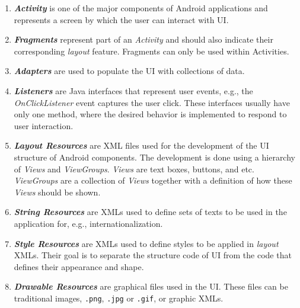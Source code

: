 \begin{enumerate}

	\item \textbf{\textit{Activity}} is one of the major components of Android applications and represents a screen by which the user can interact with \acs {UI}. 

	\item \textbf{\textit{Fragments}} represent part of an \textit{Activity} and should also indicate their corresponding \textit{layout} feature. Fragments can only be used within Activities. 

	\item \textbf{\textit{Adapters}} are used to populate the \acs{UI} with collections of data.

	\item \textbf{\textit{Listeners}} are Java interfaces that represent user events, e.g., the \textit{OnClickListener} event captures the user click. These interfaces usually have only one method, where the desired behavior is implemented to respond to user interaction.

	\item \textbf{\textit{Layout Resources}} are XML files used for the development of the \acs{UI} structure of Android components. The development is done using a hierarchy of \textit {Views} and \textit {ViewGroups}. \textit{Views} are text boxes, buttons, and etc. \textit {ViewGroups} are a collection of \textit{Views} together with a definition of how these \textit {Views} should be shown.

	\item \textbf{\textit{String Resources}} are XMLs used to define sets of texts to be used in the application for, e.g., internationalization.

	\item \textbf{\textit{Style Resources}} are XMLs used to define styles to be applied in \textit {layout} XMLs. Their goal is to separate the structure code of \acs {UI} from the code that defines their appearance and shape.

	\item \textbf{\textit{Drawable Resources}} are graphical files used in the \acs{UI}. These files can be traditional images, \texttt {.png}, \texttt{.jpg} or \texttt {.gif}, or graphic XMLs. 

\end{enumerate}
